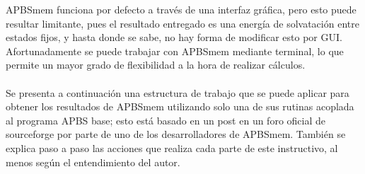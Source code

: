 
\noindent
APBSmem funciona por defecto a través de una interfaz gráfica, pero esto puede resultar limitante, pues el resultado entregado es una energía de solvatación entre estados fijos, y hasta donde se sabe, no hay forma de modificar esto por GUI. Afortunadamente se puede trabajar con APBSmem mediante terminal, lo que permite un mayor grado de flexibilidad a la hora de realizar cálculos.\\\\
Se presenta a continuación una estructura de trabajo que se puede aplicar para obtener los resultados de APBSmem utilizando solo una de sus rutinas acoplada al programa APBS base; esto está basado en un post en un foro oficial de sourceforge por parte de uno de los desarrolladores de APBSmem. También se explica paso a paso las acciones que realiza cada parte de este instructivo, al menos según el entendimiento del autor.

